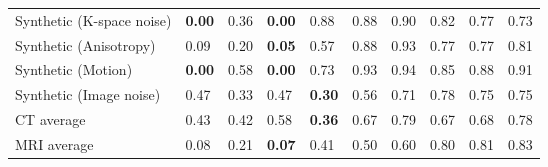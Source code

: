 \begin{table}[h]
{\begin{tabular}{llllllllll}
			Synthetic (K-space noise) &  \textbf{0.00}  &            0.36 &  \textbf{0.00}  &            0.88 &            0.88 &            0.90 &  0.82 &     0.77 &  0.73 \\
			Synthetic (Anisotropy)    &            0.09 &            0.20 &  \textbf{0.05}  &            0.57 &            0.88 &            0.93 &  0.77 &     0.77 &  0.81 \\
			Synthetic (Motion)        &  \textbf{0.00}  &            0.58 &  \textbf{0.00}  &            0.73 &            0.93 &            0.94 &  0.85 &     0.88 &  0.91 \\
			Synthetic (Image noise)   &            0.47 &            0.33 &            0.47 &  \textbf{0.30}  &            0.56 &            0.71 &  0.78 &     0.75 &  0.75 \\
			\midrule
			CT average                &            0.43 &            0.42 &            0.58 &  \textbf{0.36}  &            0.67 &            0.79 &  0.67 &     0.68 &  0.78 \\
			MRI average               &            0.08 &            0.21 &  \textbf{0.07}  &            0.41 &            0.50 &            0.60 &  0.80 &     0.81 &  0.83 \\
			\bottomrule
	\end{tabular}}
	\label{tab:res_fpr}
\end{table}
